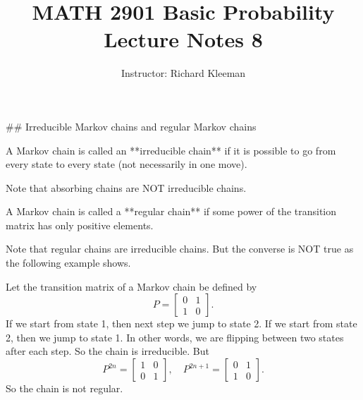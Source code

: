 


\title{MATH 2901 Basic Probability Lecture Notes 8}
\author{Instructor: Richard Kleeman}
\date{}
\maketitle


## Irreducible Markov chains and regular Markov chains
\begin{definition}
A Markov chain is called an **irreducible chain** if it is possible to go from every state to every state (not necessarily in one move).
\end{definition}

\begin{remark}
Note that absorbing chains are NOT irreducible chains.
\end{remark}

\begin{definition}
A Markov chain is called a **regular chain** if some power of the transition matrix has only positive elements. 
\end{definition}

\begin{remark}
Note that regular chains are irreducible chains. But the converse is NOT true as the following example shows.
\end{remark}

\begin{example}
Let the transition matrix of a Markov chain be defined by
\begin{equation*}
    P = \begin{bmatrix} 0 & 1 \\ 1 & 0 \end{bmatrix}.
\end{equation*}
If we start from state 1, then next step we jump to state 2. If we start from state 2, then we jump to state 1. In other words, we are flipping between two states after each step. So the chain is irreducible. But 
\begin{equation*}
    P^{2n} = \begin{bmatrix} 1 & 0 \\ 0 & 1 \end{bmatrix}, \quad 
    P^{2n+1} = \begin{bmatrix} 0 & 1 \\ 1 & 0 \end{bmatrix}.
\end{equation*}
So the chain is not regular.
\end{example}


